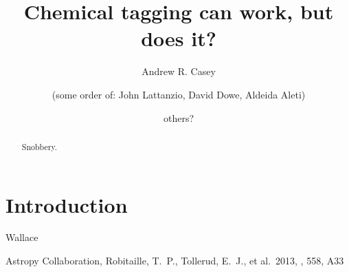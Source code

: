 \documentclass{aastex61}
\begin{document}
\title{Chemical tagging can work, but does it?}



\author[0000-0003-0174-0564]{Andrew R. Casey}

\author{(some order of: John Lattanzio, David Dowe, Aldeida Aleti)}

\author{others?}
 
\begin{abstract}
Snobbery.
\end{abstract}

\keywords{}

\section{Introduction} 
\label{sec:introduction}



\acknowledgments
Wallace



\begin{thebibliography}{}

 Astropy Collaboration, Robitaille, T.~P., Tollerud, E.~J., et al.\ 2013, \aap, 558, A33 

\end{thebibliography}
\end{document}
